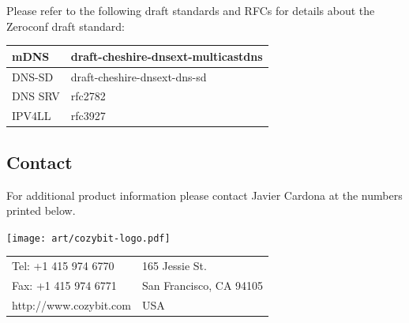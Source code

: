 \documentclass[12pt,landscape,twocolumn]{article}
\begin{document}
Please refer to the following draft standards and RFCs for details about the
Zeroconf draft standard:

\vspace{1ex}
\begin{tabular}{|l|l|}
\hline
mDNS & draft-cheshire-dnsext-multicastdns \\
\hline
DNS-SD & draft-cheshire-dnsext-dns-sd \\
\hline
DNS SRV & rfc2782 \\
\hline
IPV4LL & rfc3927 \\
\hline
\end{tabular}

\subsection*{Contact}
For additional product information please contact Javier Cardona at the numbers
printed below.

\strut{\vspace{1in}}
\begin{center}
\texttt{[image: art/cozybit-logo.pdf]}\\
\vspace{3ex}
{\scriptsize 
\begin{tabular}{l l}
Tel: +1 415 974 6770   & 165 Jessie St. \\
Fax: +1 415 974 6771    & San Francisco, CA 94105 \\
http://www.cozybit.com  & USA \\
\end{tabular}}
\end{center}
\end{document}
